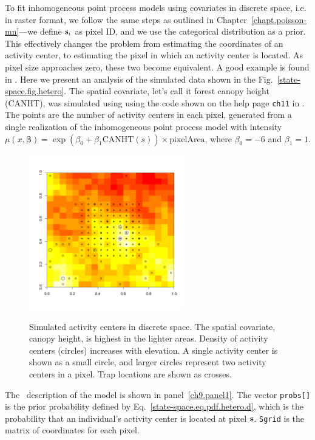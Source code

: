 To fit inhomogeneous point process models using covariates in discrete
space, i.e. in raster format, we follow the same steps
as outlined in Chapter~\ref{chapt.poisson-mn}---we define ${\bf s}_i$ as
pixel ID, and we use the categorical distribution as a prior. This
effectively changes the problem from estimating the coordinates of an
activity center, to estimating the pixel in which an activity center is
located. As pixel size approaches zero, these two become equivalent. A good
example is found in \citep{mollet_etal:2012}. Here we present
an analysis of the simulated data shown in the %
Fig.~\ref{state-space.fig.hetero}. The spatial covariate, let's call it
forest canopy height (CANHT), was simulated
using using the code shown on the help page
\verb+ch11+ in \scrbook. The points are the number of
activity centers in each pixel, generated from a single realization of
the inhomogeneous point process model with intensity
$\mu(x, \bm{\beta}) = \exp(\beta_0 + \beta_1 \text{CANHT}(s))\times\text{pixelArea}$,
where $\beta_0 = -6$ and $\beta_1 = 1$.
\begin{figure}[ht]
\centering
\includegraphics[width=0.6\textwidth]{Ch11/figs/discrete}
\label{ch9.fig.discrete}
\caption{Simulated activity centers in discrete space. The spatial
  covariate, canopy height, is highest in the lighter areas. Density of
  activity centers (circles) increases with elevation. A single
  activity center is shown as a small circle, and larger circles
  represent two activity centers in a pixel. Trap locations
  are shown as crosses.}
\end{figure}

The \bugs~description of the model is shown in
panel~\ref{ch9.panel1}. The vector \verb+probs[]+ is the prior
probability defined
by Eq.~\ref{state-space.eq.pdf.hetero.d}, which is the probability that an individual's
activity center is located at pixel $\bf s$. \verb+Sgrid+ is the
matrix of coordinates for each pixel.

